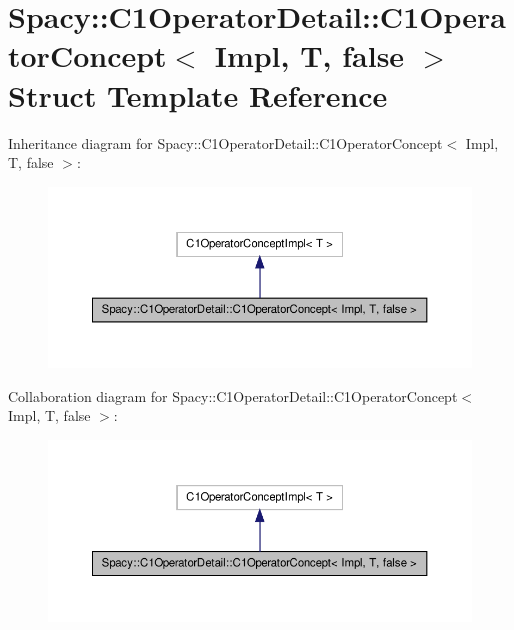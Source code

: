 \hypertarget{structSpacy_1_1C1OperatorDetail_1_1C1OperatorConcept_3_01Impl_00_01T_00_01false_01_4}{\section{\-Spacy\-:\-:\-C1\-Operator\-Detail\-:\-:\-C1\-Operator\-Concept$<$ \-Impl, \-T, false $>$ \-Struct \-Template \-Reference}
\label{structSpacy_1_1C1OperatorDetail_1_1C1OperatorConcept_3_01Impl_00_01T_00_01false_01_4}
}


\-Inheritance diagram for \-Spacy\-:\-:\-C1\-Operator\-Detail\-:\-:\-C1\-Operator\-Concept$<$ \-Impl, \-T, false $>$\-:
\nopagebreak
\begin{figure}[H]
\begin{center}
\leavevmode
\includegraphics[width=350pt]{structSpacy_1_1C1OperatorDetail_1_1C1OperatorConcept_3_01Impl_00_01T_00_01false_01_4__inherit__graph}
\end{center}
\end{figure}


\-Collaboration diagram for \-Spacy\-:\-:\-C1\-Operator\-Detail\-:\-:\-C1\-Operator\-Concept$<$ \-Impl, \-T, false $>$\-:
\nopagebreak
\begin{figure}[H]
\begin{center}
\leavevmode
\includegraphics[width=350pt]{structSpacy_1_1C1OperatorDetail_1_1C1OperatorConcept_3_01Impl_00_01T_00_01false_01_4__coll__graph}
\end{center}
\end{figure}

